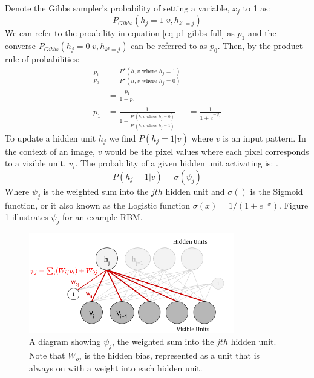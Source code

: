     Denote the Gibbs sampler's probability of setting a variable, $x_j$ to 1 as:
    \begin{equation}\label{eq-p1-gibbs-full}
    P_{Gibbs}(h_j = 1 | v, h_{k != j})
    \end{equation}
    We can refer to the proability in equation \ref{eq-p1-gibbs-full} as $p_1$ and the converse $P_{Gibbs}(h_j = 0 | v, h_{k != j})$ can be referred to as $p_0$.
    Then, by the product rule of probabilities:
    $$
    \begin{aligned}
    \frac{p_1}{p_0} &= \frac{P^\star(h,v \text{ where } h_j = 1)}{P^\star(h,v \text{ where } h_j = 0)}\\
    &= \frac{p_1}{1 - p_1} \\
    p_1 &= \frac{1}{1 + \frac{P^\star(h,v \text{ where } h_j = 0)}{P^\star(h,v \text{ where } h_j = 1)} }
    &= \frac{1}{1 + e^{-\psi_j}}
  \end{aligned}
    $$
  To update a hidden unit $h_j$
  we find $ P(h_j = 1 | v) $ where $v$ is an input pattern. In the context of an image, $ v $ would be the pixel values where each pixel corresponds to a visible unit, $v_i$.
  The probability of a given hidden unit activating is: .
    \begin{equation}\label{eq:Hid-Gibbs-Update}
    P(h_j = 1 | v) = \sigma(\psi_j)
    \end{equation}
    Where $\psi_j$ is the weighted sum into the $jth$ hidden unit and $\sigma()$ is the Sigmoid function, or it also known as the Logistic function $\sigma(x)=1/(1+e^{-x})$. Figure \ref{F:PSI} illustrates $\psi_j$ for an example RBM.
    \begin{figure}[h]
    \begin{center}
      \includegraphics[width = 0.8\textwidth]{Assets/PSI_and_PHI.png}
    \caption{A diagram showing $\psi_j$, the weighted sum into the $jth$ hidden unit. Note that $W_{oj}$ is the hidden bias, represented as a unit that is always on with a weight into each hidden unit.}
    \label{F:PSI}
    \end{center}
    \end{figure}
